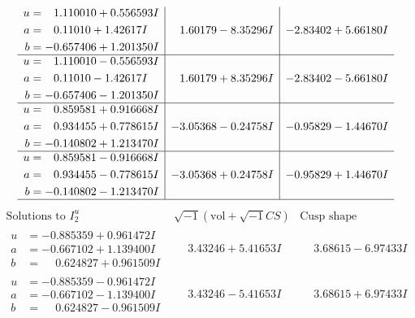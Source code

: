 \documentclass[1p]{elsarticle_modified}
\theoremstyle{definition}
\newcommand{\I}{\sqrt{-1}}
\begin{document}
$$\begin{array}{c|c|c}
\begin{aligned}
u &= \phantom{-}1.110010 + 0.556593 I \\
a &= \phantom{-}0.11010 + 1.42617 I \\
b &= -0.657406 + 1.201350 I\end{aligned}
 & \phantom{-}1.60179 - 8.35296 I & -2.83402 + 5.66180 I \\ \hline\begin{aligned}
u &= \phantom{-}1.110010 - 0.556593 I \\
a &= \phantom{-}0.11010 - 1.42617 I \\
b &= -0.657406 - 1.201350 I\end{aligned}
 & \phantom{-}1.60179 + 8.35296 I & -2.83402 - 5.66180 I \\ \hline\begin{aligned}
u &= \phantom{-}0.859581 + 0.916668 I \\
a &= \phantom{-}0.934455 + 0.778615 I \\
b &= -0.140802 + 1.213470 I\end{aligned}
 & -3.05368 - 0.24758 I & -0.95829 - 1.44670 I \\ \hline\begin{aligned}
u &= \phantom{-}0.859581 - 0.916668 I \\
a &= \phantom{-}0.934455 - 0.778615 I \\
b &= -0.140802 - 1.213470 I\end{aligned}
 & -3.05368 + 0.24758 I & -0.95829 + 1.44670 I\\
 \hline 
 \end{array}$$\newpage$$\begin{array}{c|c|c}  
\text{Solutions to }I^u_{2}& \I (\text{vol} + \sqrt{-1}CS) & \text{Cusp shape}\\
 \hline 
\begin{aligned}
u &= -0.885359 + 0.961472 I \\
a &= -0.667102 + 1.139400 I \\
b &= \phantom{-}0.624827 + 0.961509 I\end{aligned}
 & \phantom{-}3.43246 + 5.41653 I & \phantom{-}3.68615 - 6.97433 I \\ \hline\begin{aligned}
u &= -0.885359 - 0.961472 I \\
a &= -0.667102 - 1.139400 I \\
b &= \phantom{-}0.624827 - 0.961509 I\end{aligned}
 & \phantom{-}3.43246 - 5.41653 I & \phantom{-}3.68615 + 6.97433 I \\ \hline\begin{aligned}

\end{aligned}
\end{array}$$
\end{document}

